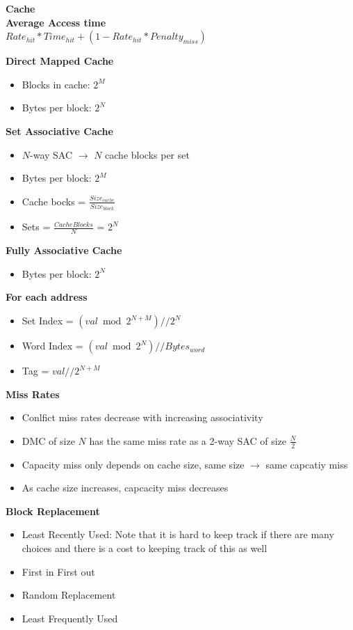 \documentclass[a4paper]{article} \usepackage[backend=biber, style=numeric, sorting=none]{biblatex}
\begin{document}
\begin{multicols*}{4}
{\small\textbf{Cache}}
\\ \textbf{{Average Access time}}
\\ $Rate_{hit} * Time_{hit} + (1 - Rate_{hit} * Penalty_{miss})$

\textbf{{Direct Mapped Cache}}
\begin{itemize}[leftmargin=*]
\itemsep -0.5em
\item Blocks in cache: $2^M$
\item Bytes per block: $2^N$
\end{itemize}

\textbf{{Set Associative Cache}}
\begin{itemize}[leftmargin=*]
\itemsep -0.5em
\item $N$-way SAC $\rightarrow$ $N$ cache blocks per set
\item Bytes per block: $2^M$
\item Cache bocks = $\frac{Size_{cache}}{Size_{block}}$
\item Sets = $\frac{CacheBlocks}{N}$ = $2^N$
\end{itemize}

\textbf{{Fully Associative Cache}}
\begin{itemize}[leftmargin=*]
\itemsep -0.5em
\item Bytes per block: $2^N$
\end{itemize}

\textbf{{For each address}}
\begin{itemize}[leftmargin=*]
\itemsep -0.5em
\item Set Index =  $(val \bmod 2^{N + M}) // 2^N$
\item Word Index =  $(val \bmod 2^{N}) // Bytes_{word}$
\item Tag =  $val // 2^{N + M}$
\end{itemize}

\textbf{{Miss Rates}}
\begin{itemize}[leftmargin=*]
\itemsep -0.5em
\item Conlfict miss rates decrease with increasing associativity
\item DMC of size $N$ has the same miss rate as a 2-way SAC of size $\frac{N}{2}$
\item Capacity miss only depends on cache size, same size $\rightarrow$ same capcatiy miss
\item As cache size increases, capcacity miss decreases
\end{itemize}

\textbf{{Block Replacement}}
\begin{itemize}[leftmargin=*]
\itemsep -0.5em
\item Least Recently Used: Note that it is hard to keep track if there are many choices and there is a cost to keeping track of this as well
\item First in First out
\item Random Replacement
\item Least Frequently Used
\end{itemize}


\end{multicols*}
\end{document}
